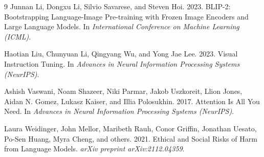 \documentclass[11pt]{article}
\begin{document}
\begin{thebibliography}{9}
Junnan Li, Dongxu Li, Silvio Savarese, and Steven Hoi. 2023.
\newblock BLIP-2: Bootstrapping Language-Image Pre-training with Frozen Image Encoders and Large Language Models.
\newblock In \textit{International Conference on Machine Learning (ICML)}.

Haotian Liu, Chunyuan Li, Qingyang Wu, and Yong Jae Lee. 2023.
\newblock Visual Instruction Tuning.
\newblock In \textit{Advances in Neural Information Processing Systems (NeurIPS)}.

Ashish Vaswani, Noam Shazeer, Niki Parmar, Jakob Uszkoreit,
Llion Jones, Aidan N. Gomez, Lukasz Kaiser, and Illia Polosukhin. 2017.
\newblock Attention Is All You Need.
\newblock In \textit{Advances in Neural Information Processing Systems (NeurIPS)}.

Laura Weidinger, John Mellor, Maribeth Rauh, Conor Griffin,
Jonathan Uesato, Po-Sen Huang, Myra Cheng, and others. 2021.
\newblock Ethical and Social Risks of Harm from Language Models.
\newblock \textit{arXiv preprint arXiv:2112.04359}.

\end{thebibliography}
\end{document}
